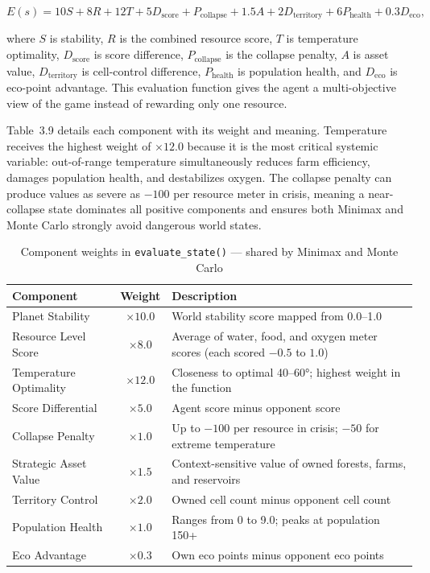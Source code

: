 \documentclass[12pt,a4paper]{article}
\begin{document}
\begin{equation}
E(s) = 10S + 8R + 12T + 5D_{\text{score}} + P_{\text{collapse}} + 1.5A + 2D_{\text{territory}} + 6P_{\text{health}} + 0.3D_{\text{eco}},
\end{equation}

where $S$ is stability, $R$ is the combined resource score, $T$ is temperature optimality, $D_{\text{score}}$ is score difference, $P_{\text{collapse}}$ is the collapse penalty, $A$ is asset value, $D_{\text{territory}}$ is cell-control difference, $P_{\text{health}}$ is population health, and $D_{\text{eco}}$ is eco-point advantage. This evaluation function gives the agent a multi-objective view of the game instead of rewarding only one resource.

Table~3.9 details each component with its weight and meaning. Temperature receives the highest weight of $\times 12.0$ because it is the most critical systemic variable: out-of-range temperature simultaneously reduces farm efficiency, damages population health, and destabilizes oxygen. The collapse penalty can produce values as severe as $-100$ per resource meter in crisis, meaning a near-collapse state dominates all positive components and ensures both Minimax and Monte Carlo strongly avoid dangerous world states.

\begin{table}[H]
\centering
\small
\begin{tabular}{|l|c|p{7cm}|}
\hline
\textbf{Component} & \textbf{Weight} & \textbf{Description} \\ \hline
Planet Stability       & $\times 10.0$ & World stability score mapped from 0.0--1.0 \\ \hline
Resource Level Score   & $\times 8.0$  & Average of water, food, and oxygen meter scores (each scored $-0.5$ to $1.0$) \\ \hline
Temperature Optimality & $\times 12.0$ & Closeness to optimal 40--60°; highest weight in the function \\ \hline
Score Differential     & $\times 5.0$  & Agent score minus opponent score \\ \hline
Collapse Penalty       & $\times 1.0$  & Up to $-100$ per resource in crisis; $-50$ for extreme temperature \\ \hline
Strategic Asset Value  & $\times 1.5$  & Context-sensitive value of owned forests, farms, and reservoirs \\ \hline
Territory Control      & $\times 2.0$  & Owned cell count minus opponent cell count \\ \hline
Population Health      & $\times 1.0$  & Ranges from 0 to 9.0; peaks at population 150+ \\ \hline
Eco Advantage          & $\times 0.3$  & Own eco points minus opponent eco points \\ \hline
\end{tabular}
\caption{Component weights in \texttt{evaluate\_state()} — shared by Minimax and Monte Carlo}
\end{table}
\end{document}
